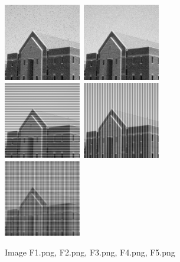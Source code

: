 {\begin{figure}[!htb]
    {\centering
    \includegraphics[width=0.30\textwidth]{F1.png} \,\includegraphics[width=0.30\textwidth]{F2.png}\\ \includegraphics[width=0.30\textwidth]{F3.png} \,\includegraphics[width=0.30\textwidth]{F4.png}\\ \includegraphics[width=0.30\textwidth]{F5.png}
        \caption{Image F1.png, F2.png, F3.png, F4.png, F5.png}
        \label{Fimages}
    \par}
    \end{figure}



}
